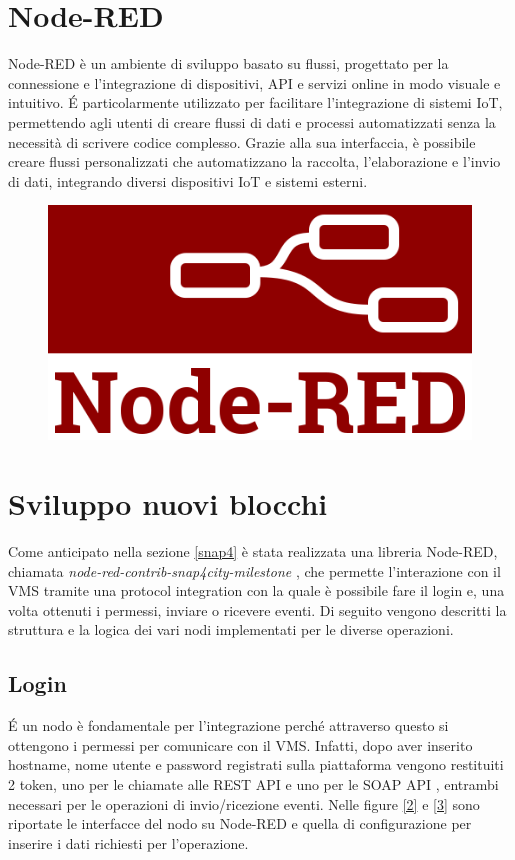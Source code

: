 \documentclass[a4paper, openright, thesis]{report}
\begin{document}
\section{Node-RED}
Node-RED è un ambiente di sviluppo basato su flussi, progettato per la connessione e l'integrazione di dispositivi, API e servizi online in modo visuale e intuitivo. \'E particolarmente utilizzato per facilitare l'integrazione di sistemi IoT, permettendo agli utenti di creare flussi di dati e processi automatizzati senza la necessità di scrivere codice complesso.
Grazie alla sua interfaccia, è possibile creare flussi personalizzati che automatizzano la raccolta, l'elaborazione e l'invio di dati, integrando diversi dispositivi IoT e sistemi esterni.
\begin{figure}[H]
    \centering
    \includegraphics[width=0.7\linewidth]{img/noderedlogo.png}
\end{figure}

\section{Sviluppo nuovi blocchi}
Come anticipato nella sezione \ref{snap4} è stata realizzata una libreria Node-RED, chiamata \textit{node-red-contrib-snap4city-milestone} \cite{noderedmilestone}, che permette l’interazione con il VMS tramite una protocol integration con la quale è possibile fare il login e, una volta ottenuti i
permessi, inviare o ricevere eventi. Di seguito vengono descritti la struttura e la logica dei vari nodi implementati per le diverse operazioni.

\subsection{Login}\label{login} \'E un nodo è fondamentale per l’integrazione perché attraverso questo si
ottengono i permessi per comunicare con il VMS. Infatti, dopo aver inserito hostname, nome utente e password registrati sulla piattaforma vengono restituiti
2 token, uno per le chiamate alle REST API \cite{RestAPIdoc} e uno per le SOAP API \cite{SoapAPIdoc}, entrambi necessari per
le operazioni di invio/ricezione eventi.
Nelle figure \ref{2} e \ref{3} sono riportate le interfacce del nodo su Node-RED e quella di
configurazione per inserire i dati richiesti per l’operazione.
\end{document}
